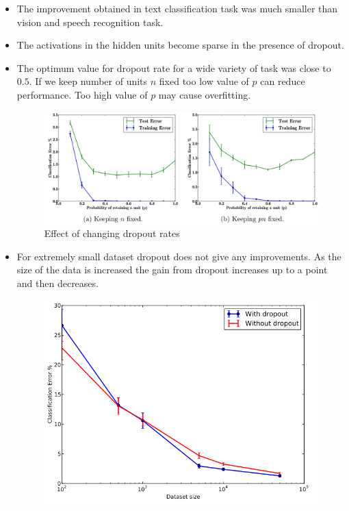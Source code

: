 \documentclass{article}
\begin{document}
\begin{itemize}
    \item The improvement obtained in text classification task was much smaller than vision and speech recognition task.
    \item The activations in the hidden units become sparse in the presence of dropout.
    \item The optimum value for dropout rate for a wide variety of task was close to $0.5$. If we keep number of units $n$ fixed too low value of $p$ can reduce performance. Too high value of $p$ may cause overfitting. 
    \begin{figure}[H]
        \centering
        \includegraphics[scale=0.5]{dropout_rate.png}
        \caption{Effect of changing dropout rates}
        \label{fig:Figure 3}
    \end{figure}
    \item For extremely small dataset dropout does not give any improvements. As the size of the data is increased the gain from dropout increases up to a point and then decreases.
    \begin{figure}[H]
        \centering
        \includegraphics[scale=0.5]{dataset_size.png}

\end{figure}
\end{itemize}
\end{document}
